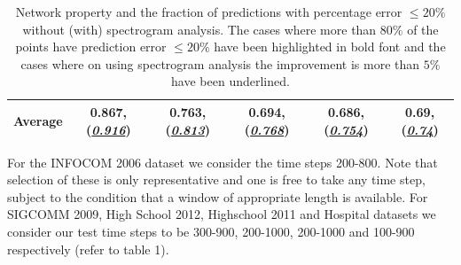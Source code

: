 \begin{table}
\begin{adjustbox}{max width=\textwidth}
\begin{tabular}{|c|c|c|c|c|c|}
\hline
Average                                                           & 0.867, (\underline{\it 0.916})                                                  & 0.763, (\underline{\it 0.813})                                                   & 0.694, (\underline{\it 0.768})                                                     & 0.686, (\underline{\it 0.754})                                                     & 0.69, (\underline{\it 0.74})    \\ \hline
\end{tabular}
\end{adjustbox}
 \caption{\label{tab_res}Network property and the fraction of predictions with percentage error  $\leq20\%$ without (with) spectrogram analysis. 
 The cases where more than $80\%$ of the points have prediction error $\leq 20\%$ have been highlighted in bold font and the cases where on using spectrogram analysis 
 the improvement is more than $5\%$ have been underlined.}

\end{table}
For the INFOCOM 2006 dataset we consider the time steps 200-800. 
Note that selection of these is only representative and one is free to take 
any time step, subject to the condition that a window of appropriate length is available. For SIGCOMM 2009, High School 2012, Highschool 2011 and Hospital datasets we 
consider our test time steps to be 300-900, 200-1000, 200-1000 and 100-900 respectively (refer to table 1). 


